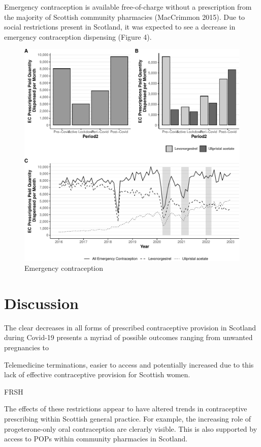 \documentclass[
]{article}
\begin{document}
Emergency contraception is available free-of-charge without a
prescription from the majority of Scottish community pharmacies
(MacCrimmon 2015). Due to social restrictions present in Scotland, it
was expected to see a decrease in emergency contraception dispensing
(Figure 4).

\begin{figure}
\centering
\includegraphics{Manuscript_files/figure-latex/Figure4-1.pdf}
\caption{Emergency contraception}
\end{figure}

\hypertarget{discussion}{%
\section{Discussion}\label{discussion}}

The clear decreases in all forms of prescribed contraceptive provision
in Scotland during Covid-19 presents a myriad of possible outcomes
ranging from unwanted pregnancies to

Telemedicine terminations, easier to access and potentially increased
due to this lack of effective contraceptive provision for Scottish
women.

FRSH

The effects of these restrictions appear to have altered trends in
contraceptive prescribing within Scottish general practice. For example,
the increasing role of progeterone-only oral contraception are clerarly
visible. This is also supported by access to POPs within community
pharmacies in Scotland.
\end{document}
